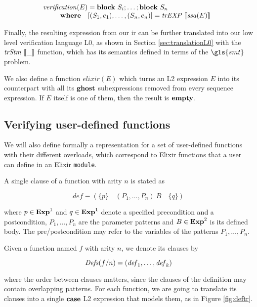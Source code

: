 \[
\begin{array}{l}
\mathit{verification}(E) = \textbf{block}~S_i;\dots;\textbf{block}~S_n\\
\qquad 
\begin{array}{ll}
\textbf{where} & [(S_1,e_1),\dots,(S_n, e_n)] = \mathit{trEXP}~\llbracket\mathit{ssa}(E)\rrbracket
\end{array}
\end{array}
\]

Finally, the resulting expression from our \gls{ir} can be further translated
into our low level verification language L0, as shown in Section
\ref{sec:translationL0} with the $\mathit{trStm}~\llbracket\_\rrbracket$ function, which has its semantics
defined in terms of the $\gls{smt}$ problem.

We also define a function $\mathit{elixir}(E)$ which turns an L2 expression $E$
into its counterpart with all its $\textbf{ghost}$ subexpressions removed from every 
sequence expression. If $E$ itself is one of them, then the result is $\textbf{empty}$.

\subsection{Verifying user-defined functions}
\label{sec:verifyuserdefined}

We will also define formally a representation for a set of user-defined
functions with their different overloads, which correspond to Elixir functions
that a user can define in an Elixir \verb|module|.

A single clause of a function with arity $n$ is stated as

\[
\mathit{def} \equiv \left(\{ p \}  \quad (P_1, \dots, P_n)~B \quad \{ q \} \right)
\]

where $p \in \mathbf{Exp}^{1}$ and $q \in \mathbf{Exp}^{1}$ denote a specified precondition and a
postcondition, $P_1, \dots, P_n$ are the parameter patterns and $B \in \mathbf{Exp}^{2}$
is its defined body. The pre/postcondition may refer to the variables of the
patterns $P_1, \dots, P_n$. 

Given a function named $f$ with arity $n$, we denote its clauses by 

$$\mathit{Defs}(f/n) = (\mathit{def}_1,\dots,\mathit{def}_k)$$

where the order between clauses matters, since the clauses of the definition may
contain overlapping patterns.  For each function, we are going to translate its
clauses into a single $\textbf{case}$ L2 expression that models them, as in Figure
\ref{fig:deftr}.

